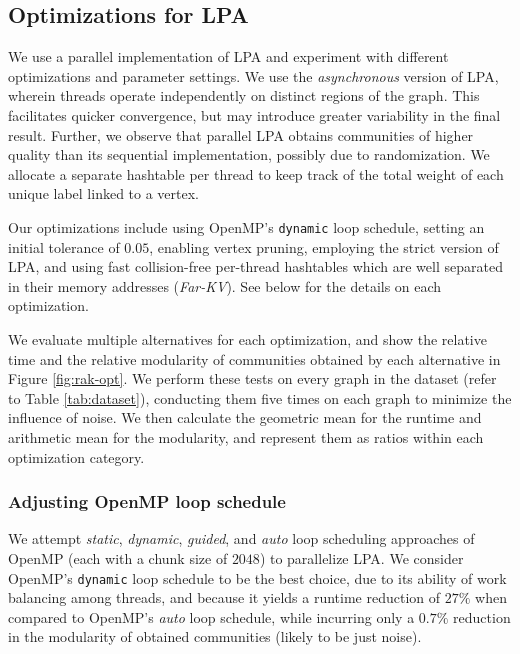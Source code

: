 \subsection{Optimizations for LPA}
\label{sec:lpa}

We use a parallel implementation of LPA and experiment with different optimizations and parameter settings. We use the \textit{asynchronous} version of LPA, wherein threads operate independently on distinct regions of the graph. This facilitates quicker convergence, but may introduce greater variability in the final result. Further, we observe that parallel LPA obtains communities of higher quality than its sequential implementation, possibly due to randomization. We allocate a separate hashtable per thread to keep track of the total weight of each unique label linked to a vertex.

Our optimizations include using OpenMP's \verb|dynamic| loop schedule, setting an initial tolerance of $0.05$, enabling vertex pruning, employing the strict version of LPA, and using fast collision-free per-thread hashtables which are well separated in their memory addresses (\textit{Far-KV}). See below for the details on each optimization.

We evaluate multiple alternatives for each optimization, and show the relative time and the relative modularity of communities obtained by each alternative in Figure \ref{fig:rak-opt}. We perform these tests on every graph in the dataset (refer to Table \ref{tab:dataset}), conducting them five times on each graph to minimize the influence of noise. We then calculate the geometric mean for the runtime and arithmetic mean for the modularity, and represent them as ratios within each optimization category.


\subsubsection{Adjusting OpenMP loop schedule}

We attempt \textit{static}, \textit{dynamic}, \textit{guided}, and \textit{auto} loop scheduling approaches of OpenMP (each with a chunk size of $2048$) to parallelize LPA. We consider OpenMP's \verb|dynamic| loop schedule to be the best choice, due to its ability of work balancing among threads, and because it yields a runtime reduction of $27\%$ when compared to OpenMP's \textit{auto} loop schedule, while incurring only a $0.7\%$ reduction in the modularity of obtained communities (likely to be just noise).


